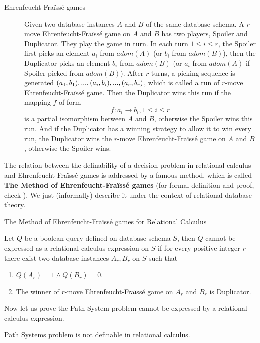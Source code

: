 \begin{description}
\item[Ehrenfeucht-Fra\"iss\'e games]
Given two database instances $A$ and $B$ of the same database schema. A $r$-move Ehrenfeucht-Fra\"iss\'e game on $A$ and $B$ has two players, Spoiler and Duplicator. They play the game in turn. In each turn $1\leq i \leq r$, the Spoiler first picks an element $a_i$ from $adom(A)$ (or $b_i$ from $adom(B)$), then the Duplicator picks an element $b_i$ from $adom(B)$ (or $a_i$ from $adom(A)$ if Spoiler picked from $adom(B)$). After $r$ turns, a picking sequence is generated $(a_1, b_1),...,(a_i,b_i),...,\\(a_r, b_r)$, which is called a run of $r$-move Ehrenfeucht-Fra\"iss\'e game. Then the Duplicator wins this run if the mapping $f$ of form
$$ f: a_i\rightarrow b_i, 1\leq i \leq r$$
is a partial isomorphism between $A$ and $B$, otherwise the Spoiler wins this run. And if the Duplicator has a winning strategy to allow it to win every run, the Duplicator wins the $r$-move Ehrenfeucht-Fra\"iss\'e game on $A$ and $B$, otherwise the Spoiler wins.
\end{description}

The relation between the definability of a decision problem in relational calculus and Ehrenfeucht-Fra\"iss\'e games is addressed by a famous method, which is called \textbf{The Method of Ehrenfeucht-Fra\"iss\'e games} (for formal definition and proof, check \cite{kolaitis1}). We just (informally) describe it under the context of relational database theory.

\begin{description}
\item[The Method of Ehrenfeucht-Fra\"iss\'e games for Relational Calculus]
\end{description}
Let $Q$ be a boolean query defined on database schema $S$, then $Q$ cannot be expressed as a relational calculus expression on $S$ if for every positive integer $r$ there exist two database instances $A_r, B_r$ on $S$ such that
\begin{enumerate}
    \item $Q(A_r)=1\land Q(B_r)=0$.
    \item The winner of $r$-move Ehrenfeucht-Fra\"iss\'e game on $A_r$ and $B_r$ is Duplicator.
\end{enumerate}
Now let us prove the Path System problem cannot be expressed by a relational calculus expression.

\begin{claim}
Path Systems problem is not definable in relational calculus.
\end{claim}

